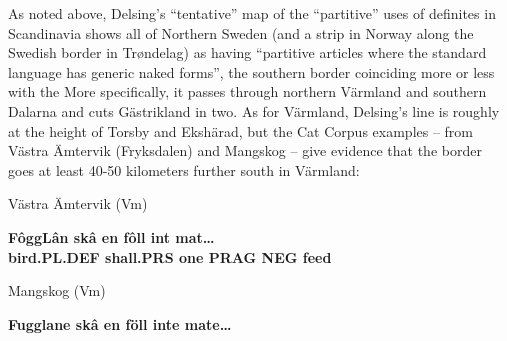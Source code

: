 
As noted above, Delsing’s “tentative” map of the “partitive” uses of definites in Scandinavia shows all of Northern Sweden (and a strip in Norway along the Swedish border in Trøndelag) as having “partitive articles where the standard language has generic naked forms”, the southern border coinciding more or less with the  More specifically, it passes through northern Värmland and southern Dalarna and cuts Gästrikland in two. As for Värmland, Delsing’s line is roughly at the height of Torsby and Ekshärad, but the Cat Corpus examples – from Västra Ämtervik (Fryksdalen) and Mangskog – give evidence that the border goes at least 40-50 kilometers further south in Värmland: 


\item 


\item 

Västra Ämtervik (Vm) 



 \ea\label{}\gll\bfseries
FôggLân  skâ  en  fôll  int  mat…\\

\bfseries
bird.PL.DEF  shall.PRS  one  PRAG  NEG  feed\\

\item 

Mangskog (Vm) 



 \ea\label{}\gll\bfseries
Fugglane  skâ  en  föll  inte  mate…\\


